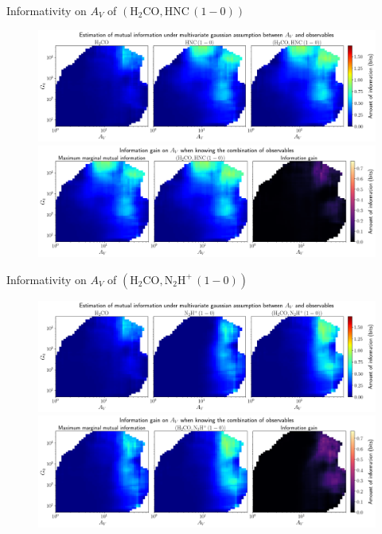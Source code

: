 \documentclass{beamer}
\begin{document}
\begin{frame}{Informativity on $A_V$ of $\left(\mathrm{H_2CO},\mathrm{HNC\,(1-0)}\right)$}
    \begin{figure}
        \centering
        \includegraphics[width=0.95\linewidth]{../linearinfogauss/av__h2co_hnc10_linearinfogauss.png}
        \vfill
        \includegraphics[width=0.95\linewidth]{../linearinfogauss/av__h2co_hnc10_linearinfogauss_gain.png}
    \end{figure}
\end{frame}

\begin{frame}{Informativity on $A_V$ of $\left(\mathrm{H_2CO},\mathrm{N_2H^+\,(1-0)}\right)$}
    \begin{figure}
        \centering
        \includegraphics[width=0.95\linewidth]{../linearinfogauss/av__h2co_n2hp10_linearinfogauss.png}
        \vfill
        \includegraphics[width=0.95\linewidth]{../linearinfogauss/av__h2co_n2hp10_linearinfogauss_gain.png}
    \end{figure}
\end{frame}
\end{document}
